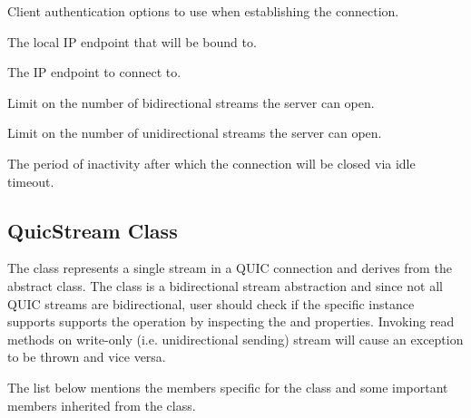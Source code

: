 \begin{description}

     Client
authentication options to use when establishing the connection.

     The local IP endpoint that will be bound
to.

     The IP endpoint to connect to.

     Limit on the number of
bidirectional streams the server can open.

     Limit on the number of
unidirectional streams the server can open.

     The period of inactivity after which the
connection will be closed via idle timeout.

\end{description}

\subsection{QuicStream Class}

The \QuicStream{} class represents a single stream in a QUIC connection and derives from the
abstract  class. The  class is a bidirectional stream abstraction and
since not all QUIC streams are bidirectional, user should check if the specific \QuicStream{}
instance supports supports the operation by inspecting the  and 
properties. Invoking read methods on write-only (i.e. unidirectional sending) stream will cause an
exception to be thrown and vice versa.

The list below mentions the members specific for the  class and some important
members inherited from the  class.

